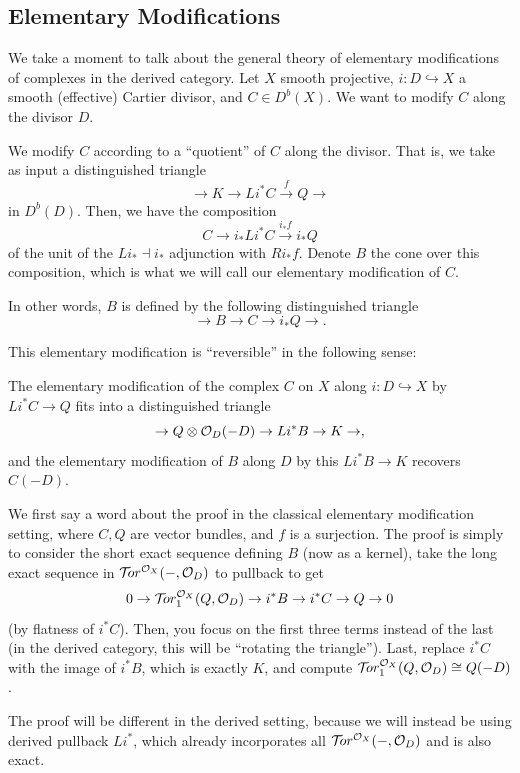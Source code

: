 \documentclass[12pt]{article}
\newcommand{\cTor}{\mathcal{T}\hspace{-0.2em}or}
\begin{document}
\subsection{Elementary Modifications}

We take a moment to talk about the general theory of elementary modifications of complexes in the derived category. Let $X$ smooth projective, $i:D\hookrightarrow X$ a smooth (effective) Cartier divisor, and $C\in D^b(X)$. We want to modify $C$ along the divisor $D$.

We modify $C$ according to a ``quotient'' of $C$ along the divisor. That is, we take as input a distinguished triangle
\[\to K \to Li^* C \xrightarrow{f} Q \to\]
in $D^b(D)$. Then, we have the composition
\[C \to i_* Li^* C \xrightarrow{i_*f} i_* Q\]
of the unit of the $Li_* \dashv i_*$ adjunction with $Ri_*f$. Denote $B$ the cone over this composition, which is what we will call our elementary modification of $C$.

In other words, $B$ is defined by the following distinguished triangle
\[\to B \to C \to i_*Q \to.\]

This elementary modification is ``reversible'' in the following sense:

\begin{prop}
    The elementary modification of the complex $C$ on $X$ along $i:D\hookrightarrow X$ by $Li^*C\to Q$ fits into a distinguished triangle
    \[\to Q\otimes \mathcal{O}_D(-D) \to Li^* B \to K \to,\]
    and the elementary modification of $B$ along $D$ by this $Li^*B\to K$ recovers $C(-D)$.
\end{prop}

\begin{rmk}
We first say a word about the proof in the classical elementary modification setting, where $C,Q$ are vector bundles, and $f$ is a surjection. The proof is simply to consider the short exact sequence defining $B$ (now as a kernel), take the long exact sequence in $\cTor^{\cO_X}(-,\cO_D)$ to pullback to get
\[0\to \cTor_1^{\cO_X}(Q,\cO_D) \to i^* B \to i^* C \to Q \to 0\]
(by flatness of $i^*C$). Then, you focus on the first three terms instead of the last (in the derived category, this will be ``rotating the triangle''). Last, replace $i^*C$ with the image of $i^*B$, which is exactly $K$, and compute $\cTor_1^{\cO_X}(Q,\cO_D)\cong Q(-D)$.

The proof will be different in the derived setting, because we will instead be using derived pullback $Li^*$, which already incorporates all $\cTor^{\cO_X}(-,\cO_D)$ and is also exact.
\end{rmk}
\end{document}
